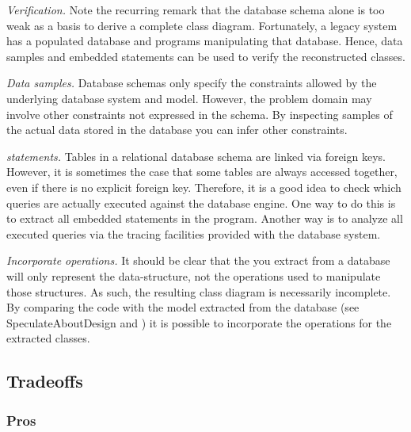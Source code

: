 \documentclass[a4paper,10pt,twoside]{book}
\begin{document}
\noindent
\emph{Verification.}
Note the recurring remark that the database schema alone is too weak as a basis to derive a 
complete class diagram. Fortunately, a legacy system has a populated database and programs 
manipulating that database. Hence, data samples and embedded  statements can be 
used to verify the reconstructed classes.

\begin{bulletlist}
\item \emph{Data samples.}
Database schemas only specify the constraints allowed by the underlying database system and 
model. However, the problem domain may involve other constraints not expressed in the 
schema. By inspecting samples of the actual data stored in the database you can infer other 
constraints.

\item \emph{ statements.}
Tables in a relational database schema are linked via foreign keys. However, it is 
sometimes the case that some tables are always accessed together, even if there is no 
explicit foreign key. Therefore, it is a good idea to check which queries are actually 
executed against the database engine. One way to do this is to extract all embedded 
 statements in the program. Another way is to analyze all executed queries via the 
tracing facilities provided with the database system.
\end{bulletlist}

\noindent
\emph{Incorporate operations.}
It should be clear that the  you extract from a database will 
only represent the data-structure, not the operations used to manipulate those structures. 
As such, the resulting class diagram is necessarily incomplete. By comparing the code with 
the model extracted from the database (see 
{SpeculateAboutDesign} and ) it is 
possible to incorporate the operations for the extracted classes.

\subsection*{Tradeoffs}

\subsubsection*{Pros}
\end{document}
